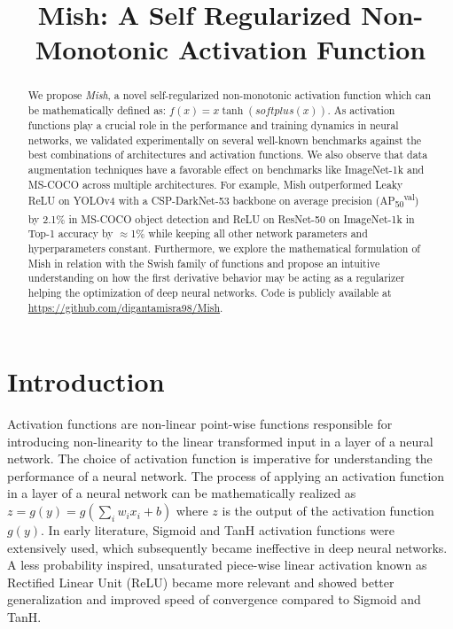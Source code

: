 \documentclass{bmvc2k}
\title{Mish: A Self Regularized Non-Monotonic Activation Function}
\begin{document}
\maketitle

\begin{abstract}
 We propose \textit{Mish}, a novel self-regularized non-monotonic activation function which can be mathematically defined as: $f(x)=x\tanh(softplus(x))$. As activation functions play a crucial role in the performance and training dynamics in neural networks, we validated experimentally on several well-known benchmarks against the best combinations of architectures and activation functions. We also observe that data augmentation techniques have a favorable effect on benchmarks like ImageNet-1k and MS-COCO across multiple architectures. For example, Mish outperformed Leaky ReLU on YOLOv4 with a CSP-DarkNet-53 backbone on average precision (AP\textsubscript{50}\textsuperscript{val}) by 2.1$\%$ in MS-COCO object detection and ReLU on ResNet-50 on ImageNet-1k in Top-1 accuracy by $\approx$1$\%$ while keeping all other network parameters and hyperparameters constant. Furthermore, we explore the mathematical formulation of Mish in relation with the Swish family of functions and propose an intuitive understanding on how the first derivative behavior may be acting as a regularizer helping the optimization of deep neural networks. Code is publicly available at \url{https://github.com/digantamisra98/Mish}.
\end{abstract}

\section{Introduction}
\label{sec:intro}
Activation functions are non-linear point-wise functions responsible for introducing non-linearity to the linear transformed input in a layer of a neural network. The choice of activation function is imperative for understanding the performance of a neural network. The process of applying an activation function in a layer of a neural network can be mathematically realized as $z=g(y)=g(\sum_{i}w_{i}x_{i} + b)$ where $z$ is the output of the activation function $g(y)$. In early literature, Sigmoid and TanH activation functions were extensively used, which subsequently became ineffective in deep neural networks. A less probability inspired, unsaturated piece-wise linear activation known as Rectified Linear Unit (ReLU) \cite{nair2010rectified,krizhevsky2012imagenet} became more relevant and showed better generalization and improved speed of convergence compared to Sigmoid and TanH. 
\end{document}
